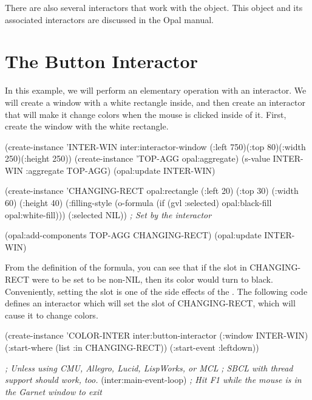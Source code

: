 There are also several interactors that work with the 
object.  This object and its associated interactors are discussed in
the Opal manual.


\section{The Button Interactor}

In this example, we will perform an elementary operation with an
interactor.  We will create a window with a white rectangle inside,
and then create an interactor that will make it change colors when
the mouse is clicked inside of it.  First, create the window with the
white rectangle.

\begin{programexample}
(create-instance 'INTER-WIN inter:interactor-window
   (:left 750)(:top 80)(:width 250)(:height 250))
(create-instance 'TOP-AGG opal:aggregate)
(s-value INTER-WIN :aggregate TOP-AGG)
(opal:update INTER-WIN)

(create-instance 'CHANGING-RECT opal:rectangle
   (:left 20) (:top 30)
   (:width 60) (:height 40)
   (:filling-style (o-formula (if (gvl :selected)
				  opal:black-fill
				  opal:white-fill)))
   (:selected NIL))  {\it ; Set by the interactor}

(opal:add-components TOP-AGG CHANGING-RECT)
(opal:update INTER-WIN)
\end{programexample}

From the definition of the  formula, you can see
that if the  slot in CHANGING-RECT were to be set to be
non-NIL, then its color would turn to black.  Conveniently, setting the
 slot is one of the side effects of the
. The following code defines an interactor which
will set the  slot of CHANGING-RECT, which will cause it
to change colors.

\begin{programexample}
(create-instance 'COLOR-INTER inter:button-interactor
   (:window INTER-WIN)
   (:start-where (list :in CHANGING-RECT))
   (:start-event :leftdown))

{\it ; Unless using CMU, Allegro, Lucid, LispWorks, or MCL}
\textit{; SBCL with thread support should work, too. }
(inter:main-event-loop)
{\it ; Hit F1 while the mouse is in the Garnet window to exit}
\end{programexample}

